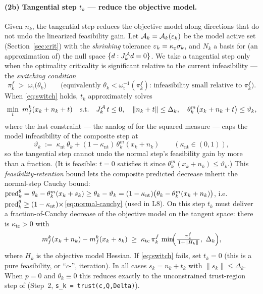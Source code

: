 \paragraph{(2b) Tangential step $t_k$ --- reduce the objective model.}
Given $n_k$, the tangential step reduces the objective model along directions that
do not undo the linearized feasibility gain. Let
$\mathcal{A}_k=\mathcal{A}_k(\varepsilon_k)$ be the model active set (Section~\ref{sec:crit}) with the
\emph{shrinking} tolerance $\varepsilon_k=\kappa_{\varepsilon}\sigma_k$, and
$N_k$ a basis for (an approximation of) the null space
$\{d:J_k^{\mathcal{A}}d=0\}$. We take a tangential step only when the optimality criticality
is significant relative to the current infeasibility --- the
\emph{switching condition} \citep[(2.29)]{GouldToint2010}
\begin{equation}
  \label{eq:switch}
  \pi_k^f \;>\; \omega_{\mathrm t}\bigl(\theta_k\bigr)
  \qquad\bigl(\text{equivalently } \theta_k<\omega_{\mathrm t}^{-1}(\pi_k^f)\text{: infeasibility small relative to } \pi_k^f\bigr).
\end{equation}
When \eqref{eq:switch} holds, $t_k$ approximately solves
\begin{equation}
  \label{eq:tang-sub}
  \min_{t}\ m_f^k(x_k+n_k+t)
  \quad\text{s.t.}\quad
  J_k^{\mathcal{A}}\,t\le 0,\quad \|n_k+t\|\le\Delta_k,\quad
  \theta_k^m\bigl(x_k+n_k+t\bigr)\le\vartheta_k,
\end{equation}
where the last constraint --- the analog of \citet[(2.28)]{GouldToint2010} for the
squared measure --- caps the model infeasibility of the composite step at
\begin{equation}
  \label{eq:retention}
  \vartheta_k \;:=\; \kappa_{\mathrm{nt}}\,\theta_k + (1-\kappa_{\mathrm{nt}})\,\theta_k^m(x_k+n_k)
  \qquad(\kappa_{\mathrm{nt}}\in(0,1)),
\end{equation}
so the tangential step cannot undo the normal step's feasibility gain by more than a
fraction. (It is feasible: $t=0$ satisfies it since $\theta_k^m(x_k+n_k)\le\vartheta_k$.)
This \emph{feasibility-retention} bound lets the composite predicted decrease inherit
the normal-step Cauchy bound:
$\operatorname{pred}^\theta_k=\theta_k-\theta_k^m(x_k+s_k)\ge\theta_k-\vartheta_k=(1-\kappa_{\mathrm{nt}})\bigl(\theta_k-\theta_k^m(x_k+n_k)\bigr)$,
i.e.\ $\operatorname{pred}^\theta_k\ge(1-\kappa_{\mathrm{nt}})\times$\eqref{eq:normal-cauchy} (used in L8).
On this step $t_k$ must deliver a fraction-of-Cauchy decrease of the objective model on the
tangent space: there is $\kappa_{\mathrm{tc}}>0$ with
\begin{equation}
  \label{eq:tang-cauchy}
  m_f^k(x_k+n_k) - m_f^k(x_k+s_k)
  \;\ge\;
  \kappa_{\mathrm{tc}}\,\pi_k^f\,
  \min\!\Bigl(\tfrac{\pi_k^f}{\,1+\|H_k\|\,},\ \Delta_k\Bigr),
\end{equation}
where $H_k$ is the objective model Hessian. If \eqref{eq:switch} fails, set
$t_k=0$ (this is a pure feasibility, or ``$c$-'', iteration). In all cases
$s_k=n_k+t_k$ with $\|s_k\|\le\Delta_k$. When $p=0$ and $\theta_k\equiv0$ this
reduces exactly to the unconstrained trust-region step of 
(Step~2, \verb|s_k = trust(c,Q,Delta)|).


